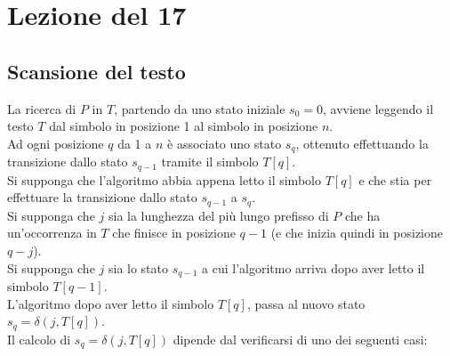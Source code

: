 \section{Lezione del 17}
\subsection{Scansione del testo}
La ricerca di $P$ in $T$, partendo da uno stato iniziale $s_0 = 0$, avviene leggendo il testo $T$ dal simbolo in posizione 1 al simbolo in posizione $n$. \\  
Ad ogni posizione $q$ da 1 a $n$ è associato uno stato $s_q$, ottenuto effettuando la transizione dallo stato $s_{q-1}$ tramite il simbolo $T[q]$.\\

Si supponga che l’algoritmo abbia appena letto il simbolo $T[q]$ e che stia per effettuare la transizione dallo stato $s_{q-1}$ a $s_q$.\\
Si supponga che $j$ sia la lunghezza del più lungo prefisso di $P$ che ha un’occorrenza in $T$ che finisce in posizione $q-1$ (e che inizia quindi in posizione $q-j$).\\
Si supponga che $j$ sia lo stato $s_{q-1}$ a cui l’algoritmo arriva dopo aver letto il simbolo $T[q-1]$. \\
L’algoritmo dopo aver letto il simbolo $T[q]$, passa al nuovo stato $s_q = \delta(j, T[q])$.\\
Il calcolo di $s_q = \delta(j, T[q])$ dipende dal verificarsi di uno dei seguenti casi:
